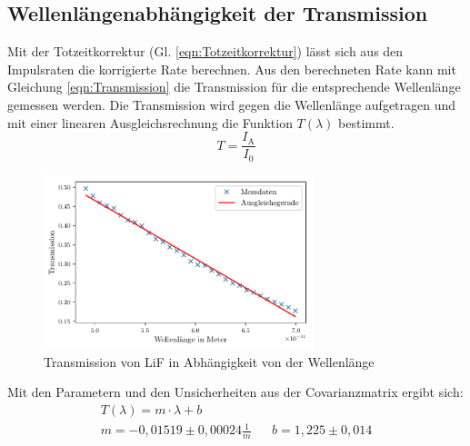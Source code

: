 \subsection{Wellenlängenabhängigkeit der Transmission}
Mit der Totzeitkorrektur (Gl. \ref{eqn:Totzeitkorrektur}) lässt sich aus den Impulsraten die korrigierte Rate berechnen.
Aus den berechneten Rate kann mit Gleichung \ref{eqn:Transmission} die Transmission für die entsprechende Wellenlänge gemessen werden.
Die Transmission wird gegen die Wellenlänge aufgetragen und mit einer linearen Ausgleichsrechnung die Funktion $T(\lambda)$ bestimmt.
\begin{equation}
    T = \frac{I_{\text{A}}}{I_0} \label{eqn:Transmission}
\end{equation}
\begin{figure}[H]
    \centering
    \includegraphics[width=0.7\textwidth]{plots/Transmission.pdf}
    \caption{Transmission von LiF in Abhängigkeit von der Wellenlänge}
    \label{fig:Transmission}
\end{figure}
Mit den Parametern und den Unsicherheiten aus der Covarianzmatrix ergibt sich:
\begin{align}
    T(\lambda) = m \cdot \lambda + b \nonumber \\
    m = -0,01519 \pm 0,00024 \frac{1}{m}&& b= 1,225 \pm 0,014 \nonumber
\end{align}

